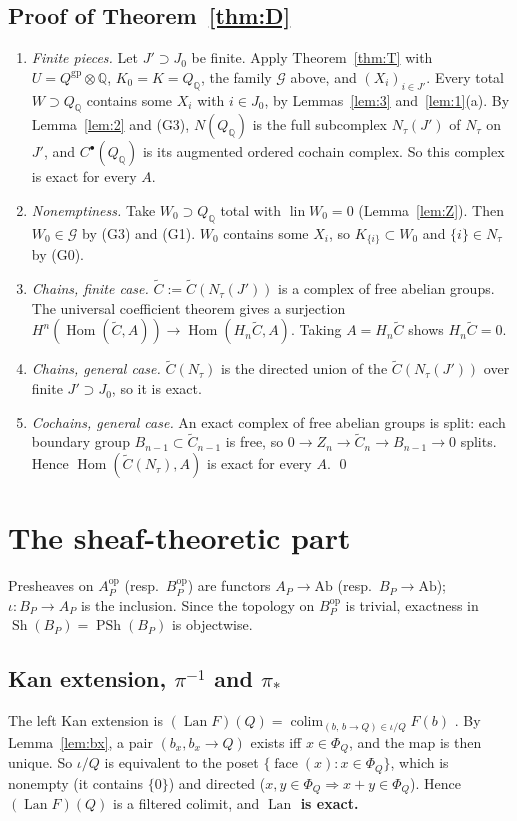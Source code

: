 \documentclass[11pt]{article}
\theoremstyle{definition}
\theoremstyle{remark}
\newcommand{\QQ}{\mathbb{Q}}
\newcommand{\gp}{\mathrm{gp}}
\newcommand{\face}{\operatorname{face}}
\newcommand{\Hom}{\operatorname{Hom}}
\newcommand{\lin}{\operatorname{lin}}
\newcommand{\Lan}{\operatorname{Lan}}
\newcommand{\colim}{\operatorname*{colim}}
\newcommand{\cG}{\mathcal{G}}
\newcommand{\Sh}{\operatorname{Sh}}
\newcommand{\PSh}{\operatorname{PSh}}
\newcommand{\Qrat}{Q_{\QQ}}
\begin{document}
\subsection{Proof of Theorem~\ref{thm:D}}
\begin{enumerate}[1.]
\item \emph{Finite pieces.} Let $J'\supset J_0$ be finite. Apply Theorem~\ref{thm:T} with $U=Q^{\gp}\otimes\QQ$, $K_0=K=\Qrat$, the family $\cG$ above, and $(X_i)_{i\in J'}$. Every total $W\supset\Qrat$ contains some $X_i$ with $i\in J_0$, by Lemmas~\ref{lem:3} and~\ref{lem:1}(a). By Lemma~\ref{lem:2} and (G3), $N(\Qrat)$ is the full subcomplex $N_\tau(J')$ of $N_\tau$ on $J'$, and $C^\bullet(\Qrat)$ is its augmented ordered cochain complex. So this complex is exact for every $A$.
\item \emph{Nonemptiness.} Take $W_0\supset\Qrat$ total with $\lin W_0=0$ (Lemma~\ref{lem:Z}). Then $W_0\in\cG$ by (G3) and (G1). $W_0$ contains some $X_i$, so $K_{\{i\}}\subset W_0$ and $\{i\}\in N_\tau$ by (G0).
\item \emph{Chains, finite case.} $\tilde C:=\tilde C(N_\tau(J'))$ is a complex of free abelian groups. The universal coefficient theorem \cite[\S3.1]{Hatcher} gives a surjection $H^n(\Hom(\tilde C,A))\to\Hom(H_n\tilde C,A)$. Taking $A=H_n\tilde C$ shows $H_n\tilde C=0$.
\item \emph{Chains, general case.} $\tilde C(N_\tau)$ is the directed union of the $\tilde C(N_\tau(J'))$ over finite $J'\supset J_0$, so it is exact.
\item \emph{Cochains, general case.} An exact complex of free abelian groups is split: each boundary group $B_{n-1}\subset\tilde C_{n-1}$ is free, so $0\to Z_n\to\tilde C_n\to B_{n-1}\to0$ splits. Hence $\Hom(\tilde C(N_\tau),A)$ is exact for every $A$. \qed
\end{enumerate}

\section{The sheaf-theoretic part}\label{sec:sheaf}

Presheaves on $A_P^{\mathrm{op}}$ (resp.\ $B_P^{\mathrm{op}}$) are functors $A_P\to\mathrm{Ab}$ (resp.\ $B_P\to\mathrm{Ab}$); $\iota\colon B_P\to A_P$ is the inclusion. Since the topology on $B_P^{\mathrm{op}}$ is trivial, exactness in $\Sh(B_P)=\PSh(B_P)$ is objectwise.

\subsection{\texorpdfstring{Kan extension, $\pi^{-1}$ and $\pi_*$}{Kan extension}}
The left Kan extension is $(\Lan F)(Q)=\colim_{(b,\,b\to Q)\in\iota/Q}F(b)$ \cite[Ch.~X]{MacLane}. By Lemma~\ref{lem:bx}, a pair $(b_x,b_x\to Q)$ exists iff $x\in\Phi_Q$, and the map is then unique. So $\iota/Q$ is equivalent to the poset $\{\face(x):x\in\Phi_Q\}$, which is nonempty (it contains $\{0\}$) and directed ($x,y\in\Phi_Q\Rightarrow x+y\in\Phi_Q$). Hence $(\Lan F)(Q)$ is a filtered colimit, and \textbf{$\Lan$ is exact.}
\end{document}
